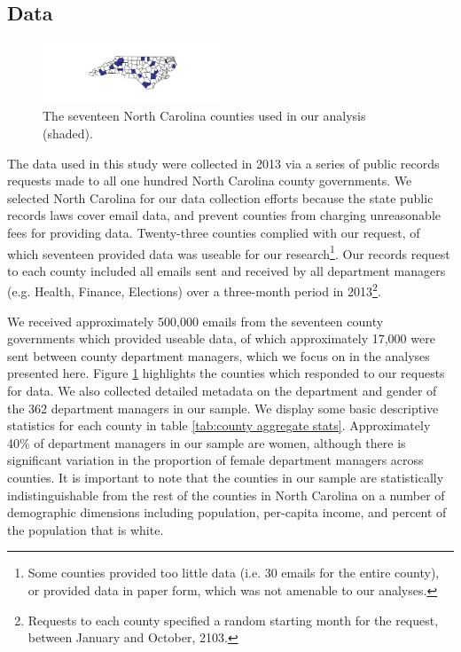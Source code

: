 \documentclass{pnastwo}
\begin{document}
\begin{article}
\section{Data}

\begin{figure}
  \centering
  \caption{\label{fig:nc map}The seventeen North Carolina counties
    used in our analysis (shaded).} \centering
  \includegraphics[width=0.48\textwidth]{images/County_Map.pdf}
\end{figure}

The data used in this study were collected in 2013 via a series of public records requests made to all one hundred North Carolina county governments. We selected North Carolina for our data collection efforts because the state public records laws cover email data, and prevent counties from charging unreasonable fees for providing data. Twenty-three counties complied with our request, of which seventeen provided data was useable for our research\footnote{Some counties provided too little data (i.e. 30 emails for the entire county), or provided data in paper form, which was not amenable to our analyses.}. Our records request to each county included all emails sent and received by all department managers (e.g. Health, Finance, Elections) over a three-month period in 2013\footnote{Requests to each county specified a random starting month for the request, between January and October, 2103.}. 

We received approximately 500,000 emails from the seventeen county governments which provided useable data, of which approximately 17,000 were sent between county department managers, which we focus on in the analyses presented here. Figure \ref{fig:nc map} highlights the counties which responded to our requests for data. We also collected detailed metadata on the department and gender of the 362 department managers in our sample. We display some basic descriptive statistics for each county in table \ref{tab:county aggregate stats}. Approximately 40\% of department managers in our sample are women, although there is significant variation in the proportion of female department managers across counties. It is important to note that the counties in our sample are statistically indistinguishable from the rest of the counties in North Carolina on a number of demographic dimensions including population, per-capita income, and percent of the population that is white.


\end{article}
\end{document}
